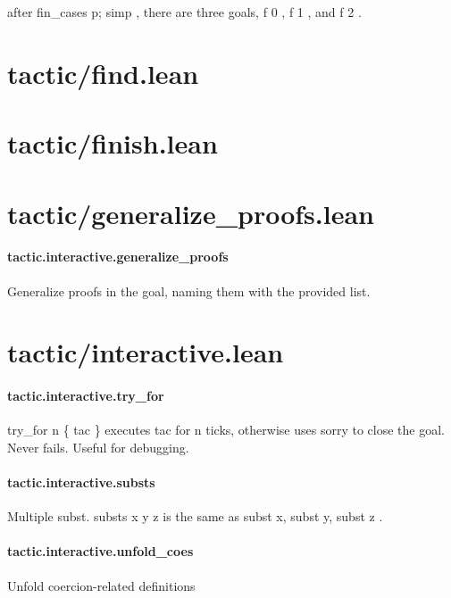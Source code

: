 \documentclass{article}
\begin{document}
after 
\colorbox[RGB]{253,246,227}{{{{\color[RGB]{101, 123, 131} fin\_cases p; simp }}}}, there are three goals, 
\colorbox[RGB]{253,246,227}{{{{\color[RGB]{101, 123, 131} f  }}}{{{\color[RGB]{108, 113, 196} 0 }}}}, 
\colorbox[RGB]{253,246,227}{{{{\color[RGB]{101, 123, 131} f  }}}{{{\color[RGB]{108, 113, 196} 1 }}}}, and 
\colorbox[RGB]{253,246,227}{{{{\color[RGB]{101, 123, 131} f  }}}{{{\color[RGB]{108, 113, 196} 2 }}}}.
\section{tactic/find.lean}\section{tactic/finish.lean}\section{tactic/generalize\_proofs.lean}\paragraph{tactic.interactive.generalize\_proofs}
\par
Generalize proofs in the goal, naming them with the provided list.
\section{tactic/interactive.lean}\paragraph{tactic.interactive.try\_for}
\par
\colorbox[RGB]{253,246,227}{{{{\color[RGB]{101, 123, 131} try\_for n \{ tac \} }}}} executes 
\colorbox[RGB]{253,246,227}{{{{\color[RGB]{101, 123, 131} tac }}}} for 
\colorbox[RGB]{253,246,227}{{{{\color[RGB]{101, 123, 131} n }}}} ticks, otherwise uses 
\colorbox[RGB]{253,246,227}{{{{\color[RGB]{101, 123, 131} sorry }}}} to close the goal.
Never fails. Useful for debugging.
\paragraph{tactic.interactive.substs}
\par
Multiple subst. 
\colorbox[RGB]{253,246,227}{{{{\color[RGB]{101, 123, 131} substs x y z }}}} is the same as 
\colorbox[RGB]{253,246,227}{{{{\color[RGB]{101, 123, 131} subst x, subst y, subst z }}}}.
\paragraph{tactic.interactive.unfold\_coes}
\par
Unfold coercion-related definitions
\end{document}
